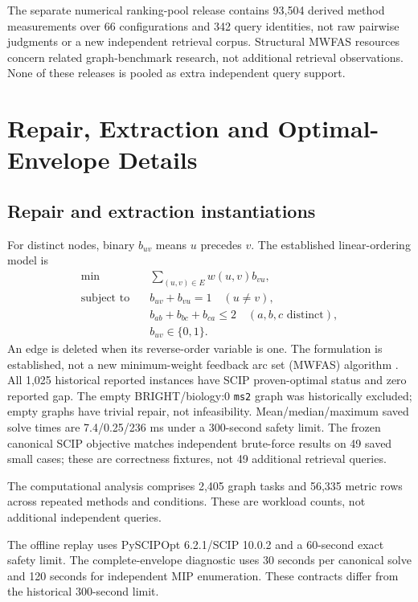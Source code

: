 \documentclass[pdflatex,sn-basic,Numbered]{sn-jnl}
\begin{document}
The separate numerical ranking-pool release contains 93,504 derived method measurements over 66 configurations and 342 query identities, not raw pairwise judgments or a new independent retrieval corpus. Structural MWFAS resources concern related graph-benchmark research, not additional retrieval observations. None of these releases is pooled as extra independent query support.

\section{Repair, Extraction and Optimal-Envelope Details}\label{sec:si-methods}
\subsection{Repair and extraction instantiations}
For distinct nodes, binary $b_{uv}$ means $u$ precedes $v$. The established linear-ordering model is
\begingroup{}
\begin{align}
\min\quad &\sum_{(u,v)\in E}w(u,v)b_{vu},\label{eq:si-mip-objective}\\
\text{subject to}\quad &b_{uv}+b_{vu}=1\quad (u\ne v),\label{eq:si-antisymmetry}\\
&b_{ab}+b_{bc}+b_{ca}\le2\quad(a,b,c\text{ distinct}),\label{eq:si-transitivity}\\
&b_{uv}\in\{0,1\}.\label{eq:si-binary}
\end{align}\endgroup
An edge is deleted when its reverse-order variable is one. The formulation is established, not a new minimum-weight feedback arc set (MWFAS) algorithm \cite{groetschel1984cutting,baharev2021exact}. All 1,025 historical reported instances have SCIP proven-optimal status and zero reported gap. The empty BRIGHT/biology:0 \texttt{ms2} graph was historically excluded; empty graphs have trivial repair, not infeasibility. Mean/median/maximum saved solve times are 7.4/0.25/236 ms under a 300-second safety limit. The frozen canonical SCIP objective matches independent brute-force results on 49 saved small cases; these are correctness fixtures, not 49 additional retrieval queries.

The computational analysis comprises 2,405 graph tasks and 56,335 metric rows across repeated methods and conditions. These are workload counts, not additional independent queries.

The offline replay uses PySCIPOpt 6.2.1/SCIP 10.0.2 and a 60-second exact safety limit. The complete-envelope diagnostic uses 30 seconds per canonical solve and 120 seconds for independent MIP enumeration. These contracts differ from the historical 300-second limit. 
\end{document}
